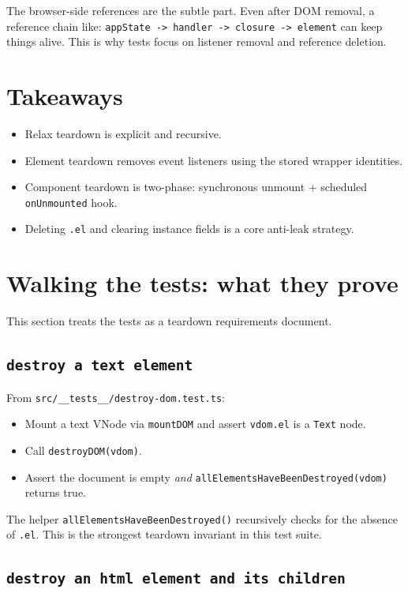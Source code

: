 The browser-side references are the subtle part. Even after DOM removal, a reference chain like:
    \texttt{appState -> handler -> closure -> element}
can keep things alive. This is why tests focus on listener removal and reference deletion.

\section{Takeaways}

\begin{itemize}
  \item Relax teardown is explicit and recursive.
  \item Element teardown removes event listeners using the stored wrapper identities.
  \item Component teardown is two-phase: synchronous unmount + scheduled \texttt{onUnmounted} hook.
  \item Deleting \texttt{.el} and clearing instance fields is a core anti-leak strategy.
\end{itemize}

\section{Walking the tests: what they prove}

This section treats the tests as a teardown requirements document.

\subsection{\texttt{destroy a text element}}

From \texttt{src/\_\_tests\_\_/destroy-dom.test.ts}:

\begin{itemize}
  \item Mount a text VNode via \texttt{mountDOM} and assert \texttt{vdom.el} is a \texttt{Text} node.
  \item Call \texttt{destroyDOM(vdom)}.
  \item Assert the document is empty \emph{and} \texttt{allElementsHaveBeenDestroyed(vdom)} returns true.
\end{itemize}

The helper \texttt{allElementsHaveBeenDestroyed()} recursively checks for the absence of \texttt{.el}. This is the strongest teardown invariant in this test suite.

\subsection{\texttt{destroy an html element and its children}}

